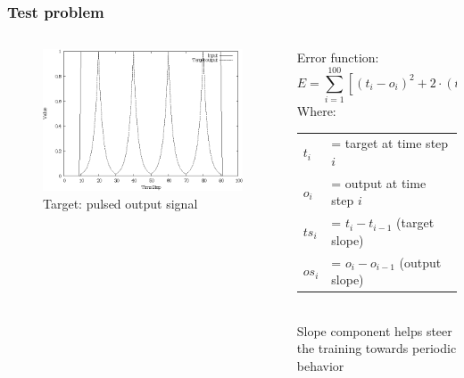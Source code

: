 \documentclass{beamer}
\begin{document}
\begin{frame}[fragile]
  \frametitle{Test problem}
  \begin{columns}
  \begin{column}{0.5\textwidth}
  \begin{figure}
   \includegraphics[scale=0.8]{targetrnn}
   \caption{Target: pulsed output signal}
  \end{figure}
  \end{column}
  \begin{column}{0.5\textwidth}
  Error function:\\
  $$E = \sum_{i=1}^{100}[(t_i-o_i)^2 + 2 \cdot (ts_i-os_i)^2]$$
  Where:\\
  \begin{tabular}{ll}
   $t_i$ & = target at time step $i$\\
   $o_i$ & = output at time step $i$\\
   $ts_i$ & = $t_i - t_{i-1}$ (target slope)\\
   $os_i$ & = $o_i - o_{i-1}$ (output slope)\\
  \end{tabular}\\
  \bigskip
  Slope component helps steer the training towards periodic behavior
  \end{column}
  \end{columns}
  
  
\end{frame}
\end{document}
